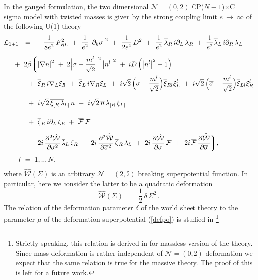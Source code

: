 \documentclass[12pt]{article}
\newcommand{\ntwot}{${\mathcal N}= \left(2,2\right) $ }
\newcommand{\ntwoo}{${\mathcal N}= \left(0,2\right) $ }
\newcommand{\p}{\partial}
\newcommand{\ov}{\overline}
\newcommand{\mc}[1]{\mathcal{#1}}
\newcommand{\bxir}{\ov{\xi}{}_R}
\newcommand{\bxil}{\ov{\xi}{}_L}
\newcommand{\xir}{\xi_R}
\newcommand{\xil}{\xi_L}
\newcommand{\bzr}{\ov{\zeta}{}_R}
\newcommand{\zr}{\zeta_R}
\newcommand{\nbar}{\ov{n}}
\newcommand{\CPC}{CP($N-1$)$\times$C }
\newcommand{\lar}{\lambda_R}
\newcommand{\lal}{\lambda_L}
\newcommand{\blar}{\ov{\lambda}{}_R}
\newcommand{\blal}{\ov{\lambda}{}_L}
\newcommand{\ff}{\mc{F}}
\newcommand{\bff}{\ov{\mc{F}}}
\begin{document}
In the gauged formulation, the two dimensional
\ntwoo \CPC sigma model with twisted
masses  is given by the strong coupling limit $ e ~\to~ \infty $ of
the following U(1) theory
\begin{align}
\label{sigma_full}
% 
\notag
 	\mc{L}_\text{1+1} & ~~=~~
	-\,\frac{1}{8e^2}\,F_{RL}^2  ~+~ \frac{1}{e^2} \left|\p_k \sigma\right|^2 
	~+~ \frac{1}{2e^2}\, D^2
	~+~ \frac{1}{e^2}\, \blar\, i\p_L\, \lar  ~+~  \frac{1}{e^2} \blal\, i\p_R\, \lal
	\\[2mm]
%
\notag
	&
	\hspace{-0.4cm}
	~+~ 2\beta \biggl \lgroup
	\left| \nabla n \right|^2  ~+~ 2 \Bigl| \sigma - 
	\frac{m^l}{\sqrt{2}} \Bigr|^2 \left| n^l \right|^2
	~+~ iD \left( \left|n^l \right|^2 - 1 \right)
	\\
%
\notag
	&
	\hspace{-0.4cm}\phantom{2\beta\lgroup}
	~+~ \bxir\, i\nabla_L \xir  ~+~ \bxil\, i\nabla_R \xil ~+~
	i\sqrt{2}\, \Bigl( \sigma - \frac{m^l}{\sqrt{2}} \Bigr) \ov{\xi}{}_{Rl} \xi_L^l
	~+~ i\sqrt{2}\, \Bigl( \ov{\sigma} - \frac{\ov{m}{}^l}{\sqrt{2}} \Bigr) \ov{\xi}{}_{Ll} \xi_R^l
	\\[2mm]
%
	&
	\hspace{-0.4cm}\phantom{2\beta\lgroup}
	~+~ i\sqrt{2}\, \ov{\xi_{[R}\, \lambda}{}_{L]}\, n
	~-~ i\sqrt{2}\, \nbar\,  \lambda_{[R}\, \xi_{L]}
	\\[2mm]
%
\notag
	&
	\hspace{-0.4cm}\phantom{2\beta\lgroup}
	~+~ \bzr\, i\p_L\, \zr   ~+~   \bff\, \ff
	\\
%
\notag
	&
	\hspace{-0.4cm}\phantom{2\beta\lgroup}
	~-~ 2i\, \frac{\p^2 \hat{\mc{W}}}{\p \sigma^2}\, \blal\, \zr
	~-~ 2i\, \frac{\p^2 \hat{\ov{\mc{W}}}}{\p \ov{\sigma}{}^2}\, \bzr\, \lal
	~+~ 2i\, \frac{\p \hat{\mc{W}}}{\p \sigma}\, \ff
	~+~ 2i\, \bff\, \frac{\p \hat{\ov{\mc{W}}}}{\p \ov{\sigma}}
	\biggr\rgroup ,
	\\[1mm]
%
\notag
	&
	l~=~1,...\,N,
\end{align}
	where $ \hat{\mc{W}}(\Sigma) $ is an arbitrary \ntwot breaking superpotential function.
	In particular, here we consider
	  the latter to be a quadratic deformation
\[
	\hat{\mc{W}}(\Sigma) ~~=~~ \frac{1}{2}\, \delta\, \Sigma^2\,.
\]
The relation of the deformation parameter $\delta$ of the
world sheet theory to the  parameter $\mu$
of the  deformation superpotential (\ref{defpo}) is studied in
\cite{SYhet,BSYhet} \footnote{Strictly speaking, this 
relation is derived in \cite{SYhet,BSYhet} for massless
version of the theory. Since mass deformation is rather independent of \ntwoo deformation we expect that the same 
relation is true for the massive theory. The proof of this is
left for a future work.}
\end{document}
